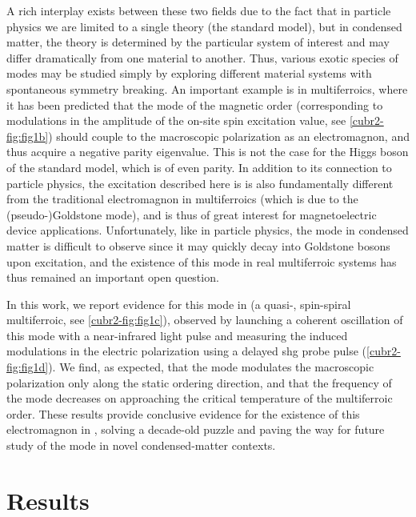 A rich interplay exists between these two fields due to the fact that in particle physics we are limited to a single theory (the standard model), but in condensed matter, the theory is determined by the particular system of interest and may differ dramatically from one material to another.
Thus, various exotic species of \higgs modes may be studied simply by exploring different material systems with spontaneous symmetry breaking.
An important example is in multiferroics, where it has been predicted\citep{matsumoto_electromagnon_2014,matsumoto_electromagnon_2015} that the \higgs mode of the magnetic order (corresponding to modulations in the amplitude of the on-site spin excitation value, see \cref{cubr2-fig:fig1b}) should couple to the macroscopic polarization as an electromagnon, and thus acquire a negative parity eigenvalue.
This is not the case for the Higgs boson of the standard model, which is of even parity\citep{atlas_collaboration_determination_2015}.
In addition to its connection to particle physics, the excitation described here is is also fundamentally different from the traditional electromagnon in multiferroics (which is due to the (pseudo-)Goldstone mode\citep{katsura_dynamical_2007}), and is thus of great interest for magnetoelectric device applications.
Unfortunately, like in particle physics, the \higgs mode in condensed matter is difficult to observe since it may quickly decay into Goldstone bosons upon excitation\cite{jain_higgs_2017}, and the existence of this mode in real multiferroic systems has thus remained an important open question.

In this work, we report evidence for this mode in  (a quasi-\oned, spin-spiral multiferroic, see \cref{cubr2-fig:fig1c}), observed by launching a coherent oscillation of this mode with a near-infrared light pulse and measuring the induced modulations in the electric polarization using a delayed \gls{shg} probe pulse (\cref{cubr2-fig:fig1d}).
We find, as expected, that the mode modulates the macroscopic polarization only along the static ordering direction, and that the frequency of the mode decreases on approaching the critical temperature of the multiferroic order.
These results provide conclusive evidence for the existence of this electromagnon in , solving a decade-old puzzle and paving the way for future study of the \higgs mode in novel condensed-matter contexts.

\section{Results}
